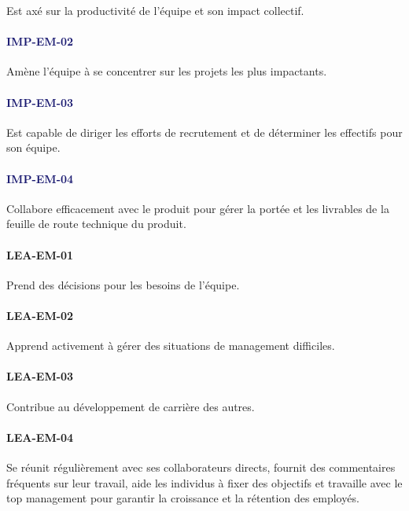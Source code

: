 \documentclass[a4paper, french, openany, 12pt]{book}
\newcommand\wis[1]{\textcolor{MidnightBlue}{\textbf{\uppercase{imp-{#1}}}}}
\newcommand\cha[1]{\textcolor{OliveGreen}{\textbf{\uppercase{lea-{#1}}}}}
\begin{document}
\begin{multicols}{2}
  Est axé sur la productivité de l'équipe et son impact collectif.

  \paragraph*{\wis{em-02}}

  Amène l'équipe à se concentrer sur les projets les plus impactants.

  \paragraph*{\wis{em-03}}

  Est capable de diriger les efforts de recrutement et de déterminer les effectifs pour son équipe.
  
  \paragraph*{\wis{em-04}}

  Collabore efficacement avec le produit pour gérer la portée et les livrables de la feuille de route technique du 
  produit.

  \paragraph*{\cha{em-01}}

  Prend des décisions pour les besoins de l'équipe.
  
  \paragraph*{\cha{em-02}}

  Apprend activement à gérer des situations de management difficiles.

  \paragraph*{\cha{em-03}}
  
  Contribue au développement de carrière des autres.
  
  \paragraph*{\cha{em-04}}

  Se réunit régulièrement avec ses collaborateurs directs, fournit des commentaires fréquents sur leur travail, aide les
  individus à fixer des objectifs et travaille avec le top management pour garantir la  croissance et la rétention des 
  employés.


\end{multicols}
\end{document}
